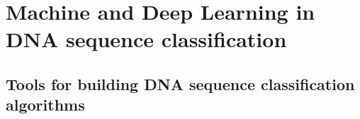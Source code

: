 
\chapter{Machine and Deep Learning in DNA sequence classification} \label{sec:ml_dl_dna}



\section{Tools for building DNA sequence classification algorithms}
